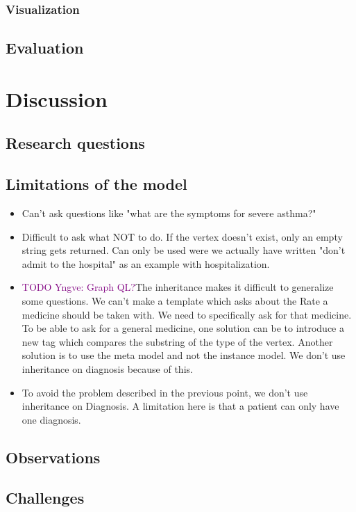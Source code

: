 \documentclass[a4paper,12pt]{book}
\begin{document}
\subsection{Visualization}
\section{Evaluation}



\chapter{Discussion}
\section{Research questions}
\section{Limitations of the model}
\begin{itemize}
	\item Can't ask questions like "what are the symptoms for severe asthma?"
	\item Difficult to ask what NOT to do. If the vertex doesn't exist, only an empty string gets returned. Can only be used were we actually have written "don't admit to the hospital" as an example with hospitalization.
	\item \textcolor{purple}{TODO Yngve: Graph QL?}The inheritance makes it difficult to generalize some questions. We can't make a template which asks about the Rate a medicine should be taken with. We need to specifically ask for that medicine. To be able to ask for a general medicine, one solution can be to introduce a new tag which compares the substring of the type of the vertex. Another solution is to use the meta model and not the instance model. We don't use inheritance on diagnosis because of this.
	\item To avoid the problem described in the previous point, we don't use inheritance on Diagnosis. A limitation here is that  
	a patient can only have one diagnosis.
\end{itemize}
\section{Observations}
\section{Challenges}
\end{document}
